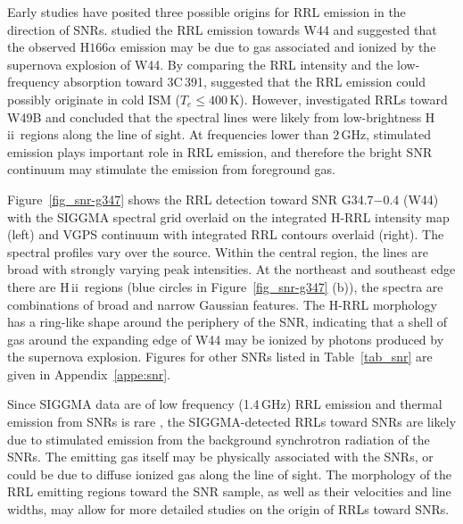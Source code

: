 \documentclass[manuscript]{aastex61}
\newcommand{\hii}{{\rm H\,}{{\sc ii}}}
\begin{document}
Early studies have posited three possible origins for RRL emission in the direction of SNRs.
\citet{Bignell1973} studied the RRL emission towards W44 and suggested that the observed H$166\alpha$ emission may be due to gas associated and ionized by the supernova explosion of W44.
By comparing the RRL intensity and the low-frequency absorption toward 3C\,391, \citet{Cesarsky1973b} suggested that the RRL emission could possibly originate in cold ISM ($T_e \leq 400$\,K).
However, \citet{Pankonin1976} investigated RRLs toward W49B and concluded that the spectral lines were likely from low-brightness \hii\ regions along the line of sight.
At frequencies lower than 2\,GHz, stimulated emission plays important role in RRL emission, and therefore the bright SNR continuum may stimulate the emission from foreground gas.

Figure~\ref{fig_snr-g347} shows the RRL detection toward SNR G34.7$-$0.4 (W44) with the SIGGMA spectral grid overlaid on the integrated H-RRL intensity map (left) and VGPS continuum with integrated RRL contours overlaid (right).
The spectral profiles vary over the source.
Within the central region, the lines are broad with strongly varying peak intensities.
At the northeast and southeast edge there are \hii\ regions (blue circles in Figure~\ref{fig_snr-g347} (b)), the spectra are combinations of broad and narrow Gaussian features.
The H-RRL morphology has a ring-like shape around the periphery of the SNR, indicating that a shell of gas around the expanding edge of W44 may be ionized by photons produced by the supernova explosion. 
Figures for other SNRs listed in Table~\ref{tab_snr} are given in Appendix~\ref{appe:snr}.

Since SIGGMA data are of low frequency (1.4\,GHz) RRL emission and thermal emission from SNRs is rare \citep{Cruciani2016}, the SIGGMA-detected RRLs toward SNRs are likely due to stimulated emission from the background synchrotron radiation of the SNRs.
The emitting gas itself may be physically associated with the SNRs, or could be due to diffuse ionized gas along the line of sight.
The morphology of the RRL emitting regions toward the SNR sample, as well as their velocities and line widths, may allow for more detailed studies on the origin of RRLs toward SNRs.
\end{document}
